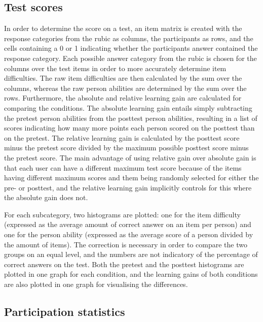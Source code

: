 \subsection{Test scores}

In order to determine the score on a test, an item matrix is created with the response categories from the rubic as columns, the participants as rows, and the cells containing a 0 or 1 indicating whether the participants answer contained the response category. Each possible answer category from the rubic is chosen for the columns over the test items in order to more accurately determine item difficulties. The raw item difficulties are then calculated by the sum over the columns, whereas the raw person abilities are determined by the sum over the rows. Furthermore, the absolute and relative learning gain are calculated for comparing the conditions. The absolute learning gain entails simply subtracting the pretest person abilities from the posttest person abilities, resulting in a list of scores indicating how many more points each person scored on the posttest than on the pretest. The relative learning gain is calculated by the posttest score minus the pretest score divided by the maximum possible posttest score minus the pretest score. The main advantage of using relative gain over absolute gain is that each user can have a different maximum test score because of the items having different maximum scores and them being randomly selected for either the pre- or posttest, and the relative learning gain implicitly controls for this where the absolute gain does not.

For each subcategory, two histograms are plotted: one for the item difficulty (expressed as the average amount of correct answer on an item per person) and one for the person ability (expressed as the average score of a person divided by the amount of items). The correction is necessary in order to compare the two groups on an equal level, and the numbers are not indicatory of the percentage of correct answers on the test. Both the pretest and the posttest histograms are plotted in one graph for each condition, and the learning gains of both conditions are also plotted in one graph for visualising the differences.

\subsection{Participation statistics}

